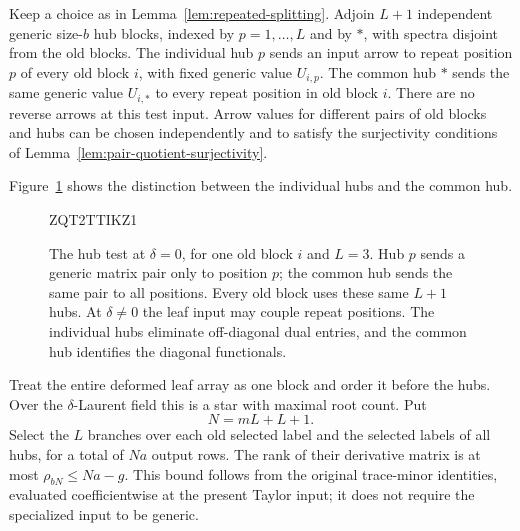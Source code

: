 \documentclass[11pt]{article}
\theoremstyle{definition}
\theoremstyle{remark}
\numberwithin{equation}{section}
\begin{document}
Keep a choice as in Lemma~\ref{lem:repeated-splitting}. Adjoin
\(L+1\) independent generic size-\(b\) hub blocks, indexed by
\(p=1,\ldots,L\) and by \(*\), with spectra disjoint from the
old blocks. The individual hub \(p\) sends an input arrow to
repeat position \(p\) of every old block \(i\), with fixed generic
value \(U_{i,p}\). The common hub \(*\) sends the same generic
value \(U_{i,*}\) to every repeat position in old block \(i\).
There are no reverse arrows at this test input. Arrow values for
different pairs of old blocks and hubs can be chosen independently
and to satisfy the surjectivity conditions of
Lemma~\ref{lem:pair-quotient-surjectivity}.

Figure~\ref{fig:hub-test} shows the distinction between the individual
hubs and the common hub.

\begin{figure}[tbp]

ZQT2TTIKZ1

\caption{The hub test at $\delta=0$, for one old block $i$ and $L=3$.
Hub $p$ sends a generic matrix pair only to position $p$; the common hub
sends the same pair to all positions. Every old block uses these same
$L+1$ hubs. At $\delta\ne0$ the leaf input may couple repeat positions.
The individual hubs eliminate off-diagonal dual entries, and the common
hub identifies the diagonal functionals.}
\label{fig:hub-test}
\end{figure}

Treat the entire deformed leaf array as one block and order it
before the hubs. Over the \(\delta\)-Laurent field this is a star
with maximal root count. Put
\[
 N=mL+L+1.
\]
Select the \(L\) branches over each old selected label and the
selected labels of all hubs, for a total of \(Na\) output rows.
The rank of their derivative matrix is at most
\(\rho_{bN}\leq Na-g\). This bound follows from the original
trace-minor identities, evaluated coefficientwise at the present
Taylor input; it does not require the specialized input to be
generic.
\end{document}
